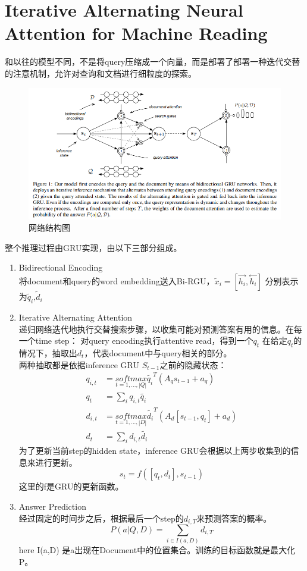 \documentclass[a4paper,UTF8]{article}
\numberwithin{equation}{section}
\begin{document}
\section{Iterative Alternating Neural Attention for Machine Reading}
和以往的模型不同，不是将query压缩成一个向量，而是部署了部署一种迭代交替的注意机制，允许对查询和文档进行细粒度的探索。
\begin{figure}[H]
	\centering
	\includegraphics[width=\textwidth]{2-1.png}
	\caption{网络结构图}
\end{figure}
整个推理过程由GRU实现，由以下三部分组成。
\begin{enumerate}
	\item Bidirectional Encoding\\
	将document和query的word embedding送入Bi-RGU，$\widetilde{x}_i=[\overset{\rightarrow}{h_i},\overset{\leftarrow}{h_i}]$
	分别表示为$\widetilde{q}_i \text{,} \widetilde{d}_i$
	\item Iterative Alternating Attention\\
	递归网络迭代地执行交替搜索步骤，以收集可能对预测答案有用的信息。在每一个time step：
	\subitem[1] 对query encoding执行attentive read，得到一个$q_t$
	\subitem[2] 在给定$q_t$的情况下，抽取出$d_t$，代表document中与query相关的部分。\\
	两种抽取都是依据inference GRU $S_{t-1}$之前的隐藏状态：
	\begin{align*}
		q_{i,t}&=\underset{t=1,...,|Q|}{softmax}\tilde{q_i}^T(A_qs_{t-1}+a_q)\\
		q_t &= \sum_i q_{i,t}\tilde{q_i}\\
		d_{i,t}&=\underset{t=1,...,|D|}{softmax}\tilde{d_i}^T(A_d[s_{t-1},q_t]+a_d)\\
		d_t &= \sum_i d_{i,t}\tilde{d_i}
	\end{align*}
	为了更新当前step的hidden state，inference GRU会根据以上两步收集到的信息来进行更新。
	$$ s_t = f([q_t,d_t],s_{t-1})$$
	这里的f是GRU的更新函数。
	\item Answer Prediction\\
	经过固定的时间步之后，根据最后一个step的$d_{i,T}$来预测答案的概率。$$P(a|Q,D)=\sum_{i \in I(a,D)}d_{i,T}$$
	here I(a,D) 是a出现在Document中的位置集合。训练的目标函数就是最大化P。
\end{enumerate}
\end{document}
